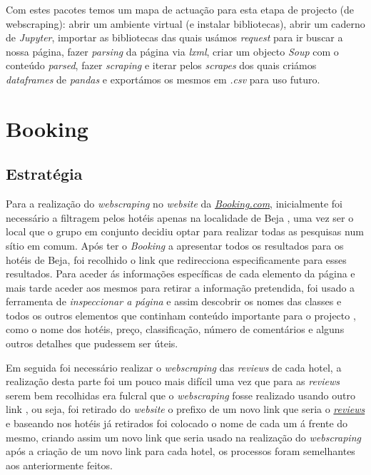 Com estes pacotes temos um mapa de actuação para esta etapa de projecto (de webscraping): abrir um ambiente virtual (e instalar bibliotecas), abrir um caderno de \textit{Jupyter}, importar as bibliotecas das quais usámos \textit{request} para ir buscar a nossa página, fazer \textit{parsing} da página via \textit{lxml}, criar um objecto \textit{Soup} com o conteúdo \textit{parsed}, fazer \textit{scraping} e iterar pelos \textit{scrapes} dos quais criámos \textit{dataframes} de \textit{pandas} e exportámos os mesmos em \textit{.csv} para uso futuro.

\section{Booking}   
\subsection{Estratégia}
Para a realização do \textit{webscraping} no \textit{website} da \href{www.Booking.com}{\textit{Booking.com}}, inicialmente foi necessário a filtragem pelos hotéis apenas na localidade de Beja \cite{yt1}, uma vez ser o local que o grupo em conjunto decidiu optar para realizar todas as pesquisas num sítio em comum.
Após ter o \textit{Booking} a apresentar todos os resultados para os hotéis de Beja, foi recolhido o link que redirecciona especificamente para esses resultados.
Para aceder ás informações específicas de cada elemento da página e mais tarde aceder aos mesmos para retirar a informação pretendida, foi usado a ferramenta de \textit{inspeccionar a página} e assim descobrir os nomes das classes e todos os outros elementos que continham conteúdo importante para o projecto \cite{yt1}, como o nome dos hotéis, preço, classificação, número de comentários e alguns outros detalhes que pudessem ser úteis.

Em seguida foi necessário realizar o \textit{webscraping} das \textit{reviews} de cada hotel, a realização desta parte foi um pouco mais difícil uma vez que para as \textit{reviews} serem bem recolhidas era fulcral que o \textit{webscraping} fosse realizado usando outro link \cite{yt1}, ou seja, foi retirado do \textit{website} o prefixo de um novo link que seria o \href{https://www.booking.com/reviews/pt/hotel/}{\textit{reviews}} e baseando nos hotéis já retirados foi colocado o nome de cada um á frente do mesmo, criando assim um novo link que seria usado na realização do \textit{webscraping} após a criação de um novo link para cada hotel, os processos foram semelhantes aos anteriormente feitos.

